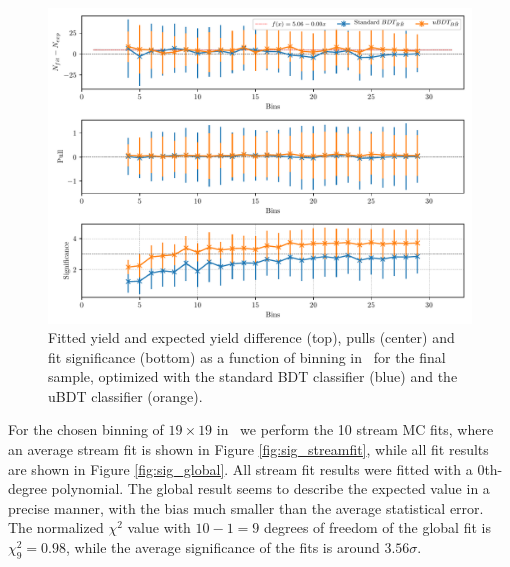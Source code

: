 \begin{figure}[H]
	\centering
	\captionsetup{width=0.8\linewidth}
	\includegraphics[width=\linewidth]{fig/sig_binning}
	\caption{Fitted yield and expected yield difference (top), pulls (center) and fit significance (bottom) as a function of binning in \vars~for the final sample, optimized with the standard BDT classifier (blue) and the uBDT classifier (orange).}
	\label{fig:sig_binning}
\end{figure}

For the chosen binning of $19 \times 19$ in \vars~we perform the 10 stream MC fits, where an average stream fit is shown in Figure \ref{fig:sig_streamfit}, while all fit results are shown in Figure \ref{fig:sig_global}. All stream fit results were fitted with a 0th-degree polynomial. The global result seems to describe the expected value in a precise manner, with the bias much smaller than the average statistical error. The normalized $\chi^2$ value with $10-1=9$ degrees of freedom of the global fit is $\chi^2_9 = 0.98$, while the average significance of the fits is around $3.56 \sigma$.

